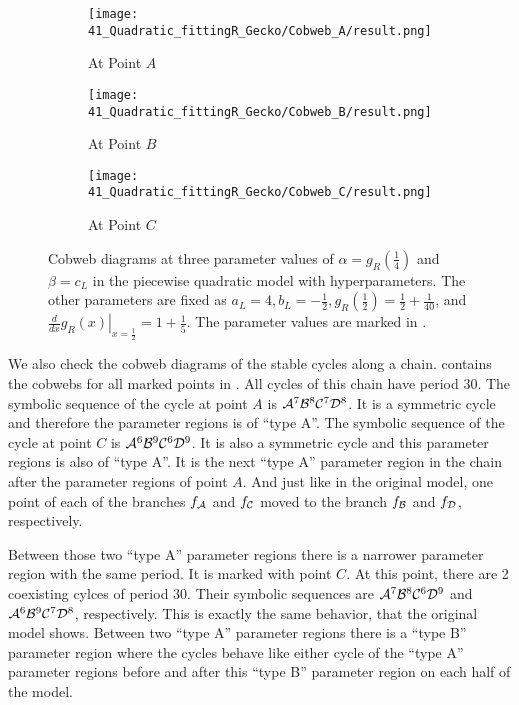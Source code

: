 \begin{figure}
	\centering
	\begin{subfigure}{0.3\textwidth}
		\centering
		\texttt{[image: 41\_Quadratic\_fittingR\_Gecko/Cobweb\_A/result.png]}
		\caption{At Point $A$}
		\label{fig:setup.quad.hyper.2.cobweb.A}
	\end{subfigure}
	\begin{subfigure}{0.3\textwidth}
		\centering
		\texttt{[image: 41\_Quadratic\_fittingR\_Gecko/Cobweb\_B/result.png]}
		\caption{At Point $B$}
		\label{fig:setup.quad.hyper.2.cobweb.B}
	\end{subfigure}
	\begin{subfigure}{0.3\textwidth}
		\centering
		\texttt{[image: 41\_Quadratic\_fittingR\_Gecko/Cobweb\_C/result.png]}
		\caption{At Point $C$}
		\label{fig:setup.quad.hyper.2.cobweb.C}
	\end{subfigure}
	\caption[Cobwebs of the piecewise quadratic model with hyperparameters for different values of the fixed parameters]{
	Cobweb diagrams at three parameter values of $\alpha = g_R\left(\frac{1}{4}\right)$ and $\beta = c_L$ in the piecewise quadratic model with hyperparameters.
	The other parameters are fixed as $a_L = 4, b_L = -\frac{1}{2}, g_R\left(\frac{1}{2}\right) = \frac{1}{2} + \frac{1}{40}$, and $\left. \frac{d}{dx} g_R(x) \right|_{x = \frac{1}{2}} = 1 + \frac{1}{5}$.
	The parameter values are marked in .
	}
	\label{fig:setup.quad.hyper.2.cobwebs}
\end{figure}

We also check the cobweb diagrams of the stable cycles along a chain.
 contains the cobwebs for all marked points in .
All cycles of this chain have period $30$.
The symbolic sequence of the cycle at point $A$ is $\mathcal{A}^7\mathcal{B}^8\mathcal{C}^7\mathcal{D}^8$.
It is a symmetric cycle and therefore the parameter regions is of ``type A''.
The symbolic sequence of the cycle at point $C$ is $\mathcal{A}^6\mathcal{B}^9\mathcal{C}^6\mathcal{D}^9$.
It is also a symmetric cycle and this parameter regions is also of ``type A''.
It is the next ``type A'' parameter region in the chain after the parameter regions of point $A$.
And just like in the original model, one point of each of the branches $f_{\mathcal{A}}$ and $f_{\mathcal{C}}$ moved to the branch $f_{\mathcal{B}}$ and $f_{\mathcal{D}}$, respectively.

Between those two ``type A'' parameter regions there is a narrower parameter region with the same period.
It is marked with point $C$.
At this point, there are 2 coexisting cylces of period 30.
Their symbolic sequences are $\mathcal{A}^7\mathcal{B}^8\mathcal{C}^6\mathcal{D}^9$ and $\mathcal{A}^6\mathcal{B}^9\mathcal{C}^7\mathcal{D}^8$, respectively.
This is exactly the same behavior, that the original model shows.
Between two ``type A'' parameter regions there is a ``type B'' parameter region where the cycles behave like either cycle of the ``type A'' parameter regions before and after this ``type B'' parameter region on each half of the model.
